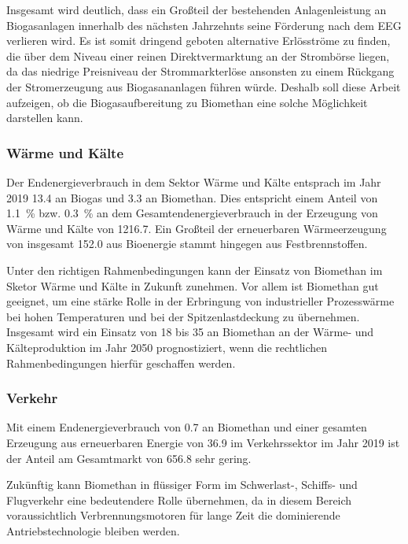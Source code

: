 Insgesamt wird deutlich, dass ein Großteil der bestehenden Anlagenleistung an Biogasanlagen innerhalb des nächsten Jahrzehnts seine Förderung nach dem \gls{EEG} verlieren wird. Es ist somit dringend geboten alternative Erlösströme zu finden, die über dem Niveau einer reinen Direktvermarktung an der Strombörse liegen, da das niedrige Preisniveau der Strommarkterlöse ansonsten zu einem Rückgang der Stromerzeugung aus Biogasananlagen führen würde. Deshalb soll diese Arbeit aufzeigen, ob die Biogasaufbereitung zu Biomethan eine solche Möglichkeit darstellen kann.


\subsubsection{Wärme und Kälte}

Der Endenergieverbrauch in dem Sektor Wärme und Kälte entsprach im Jahr 2019 \SI{13.4}{\twh} an Biogas und \SI{3.3}{\twh} an Biomethan. Dies entspricht einem Anteil von \SI{1.1}{\percent} bzw. \SI{0.3}{\percent} an dem Gesamtendenergieverbrauch in der Erzeugung von Wärme und Kälte von \SI{1216.7}{\twh}. Ein Großteil der erneuerbaren Wärmeerzeugung von insgesamt \SI{152.0}{\twh} aus Bioenergie stammt hingegen aus Festbrennstoffen. \parencite{BWE2020}\smallskip

Unter den richtigen Rahmenbedingungen kann der Einsatz von Biomethan im Sketor Wärme und Kälte in Zukunft zunehmen. Vor allem ist Biomethan gut geeignet, um eine stärke Rolle in der Erbringung von industrieller Prozesswärme bei hohen Temperaturen und bei der Spitzenlastdeckung zu übernehmen. Insgesamt wird ein Einsatz von \SI{18}{\twh} bis \SI{35}{\twh} an Biomethan an der Wärme- und Kälteproduktion im Jahr 2050 prognostiziert, wenn die rechtlichen Rahmenbedingungen hierfür geschaffen werden. \parencite{dena2017}


\subsubsection{Verkehr}

Mit einem Endenergieverbrauch von \SI{0.7}{\twh} an Biomethan und einer gesamten Erzeugung aus erneuerbaren Energie von \SI{36.9}{\twh} im Verkehrssektor im Jahr 2019 ist der Anteil am Gesamtmarkt von \SI{656.8}{\twh} sehr gering. \parencite{BWE2020} \smallskip

Zukünftig kann Biomethan in flüssiger Form im Schwerlast-, Schiffs- und Flugverkehr eine bedeutendere Rolle übernehmen, da in diesem Bereich voraussichtlich Verbrennungsmotoren für lange Zeit die dominierende Antriebstechnologie bleiben werden. \parencite{dena2017}